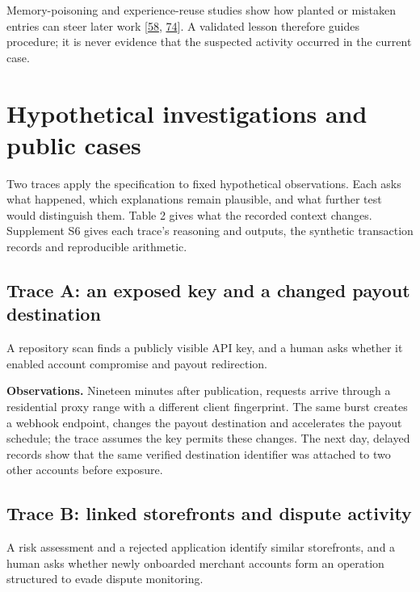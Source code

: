 \documentclass[acmlarge,nonacm]{acmart}
\begin{document}
Memory-poisoning and experience-reuse studies show how planted or
mistaken entries can steer later work
{[}\protect\hyperlink{ref-Dash2026}{58},
\protect\hyperlink{ref-Xiong2026MemoryManagement}{74}{]}. A validated
lesson therefore guides procedure; it is never evidence that the
suspected activity occurred in the current case.

\hypertarget{hypothetical-investigations-and-public-cases}{%
\section{Hypothetical investigations and public
cases}\label{hypothetical-investigations-and-public-cases}}

Two traces apply the specification to fixed hypothetical observations.
Each asks what happened, which explanations remain plausible, and what
further test would distinguish them. Table 2 gives what the recorded
context changes. Supplement S6 gives each trace's reasoning and outputs,
the synthetic transaction records and reproducible arithmetic.

\hypertarget{trace-a-an-exposed-key-and-a-changed-payout-destination}{%
\subsection{Trace A: an exposed key and a changed payout
destination}\label{trace-a-an-exposed-key-and-a-changed-payout-destination}}

A repository scan finds a publicly visible API key, and a human asks
whether it enabled account compromise and payout redirection.

\textbf{Observations.} Nineteen minutes after publication, requests
arrive through a residential proxy range with a different client
fingerprint. The same burst creates a webhook endpoint, changes the
payout destination and accelerates the payout schedule; the trace
assumes the key permits these changes. The next day, delayed records
show that the same verified destination identifier was attached to two
other accounts before exposure.

\hypertarget{trace-b-linked-storefronts-and-dispute-activity}{%
\subsection{Trace B: linked storefronts and dispute
activity}\label{trace-b-linked-storefronts-and-dispute-activity}}

A risk assessment and a rejected application identify similar
storefronts, and a human asks whether newly onboarded merchant accounts
form an operation structured to evade dispute monitoring.
\end{document}
